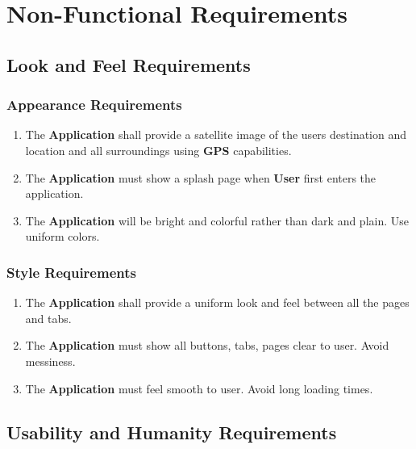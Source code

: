 \documentclass[english]{article}
\begin{document}

\section{Non-Functional Requirements}
\label{sec:non-functional_requirements}
\subsection{Look and Feel Requirements}
\label{sub:look_and_feel_requirements}

\subsubsection{Appearance Requirements}
\label{ssub:appearance_requirements}
\begin{enumerate}[{AR}1. ]
	\item The \textbf{Application} shall provide a satellite image of the users destination and location and all surroundings using \textbf{GPS} capabilities.
	\item The \textbf{Application} must show a splash page when \textbf{User} first enters the application.
	\item The \textbf{Application} will be bright and colorful rather than dark and plain. Use uniform colors.
\end{enumerate}

\subsubsection{Style Requirements}
\label{ssub:style_requirements}
\begin{enumerate}[{SR}1. ]
	\item The \textbf{Application} shall provide a uniform look and feel between all the pages and tabs.
	\item The \textbf{Application} must show all buttons, tabs, pages clear to user. Avoid messiness.
	\item The \textbf{Application} must feel smooth to user. Avoid long loading times. 
\end{enumerate}


\subsection{Usability and Humanity Requirements}
\label{sub:usability_and_humanity_requirements}
\end{document}
